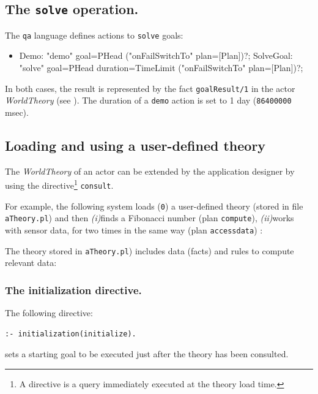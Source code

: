 \subsection{The \texttt{solve} operation.}

The \texttt{qa} language defines actions to \texttt{solve} \prolog{} goals: 
 
\begin{itemize}
\item
\begin{javacode}  
Demo:	"demo" goal=PHead ("onFailSwitchTo" plan=[Plan])?;
SolveGoal:	"solve" goal=PHead duration=TimeLimit ("onFailSwitchTo" plan=[Plan])?;
\end{javacode}
\end{itemize}

In both cases, the result is represented by the fact \texttt{goalResult/1} in the actor \textit{WorldTheory} (see ). The duration of a \texttt{demo} action is set to 1 day (\texttt{86400000} msec).

\subsection{Loading and using a user-defined theory}
The \textit{WorldTheory} of an actor can be extended by the application designer by using the directive\footnote{A \tuprolog{} directive is a query immediately executed at the theory load time.} \texttt{consult}. 

For example, the following system loads (\texttt{0}) a user-defined theory (stored in file \texttt{aTheory.pl}) and then \textit{(i)}finds a Fibonacci number (plan \texttt{compute}), \textit{(ii)}works with sensor data, for two times in the same way (plan \texttt{accessdata}) :

  

The theory stored in \texttt{aTheory.pl}) includes data (facts) and rules to compute relevant data:
  

\subsubsection{The initialization directive.}
The following directive:
\medskip 
\begin{Verbatim}[fontsize=\scriptsize, frame=single]
:- initialization(initialize).  
\end{Verbatim}
sets a starting goal to be executed just after the theory has been consulted. 

